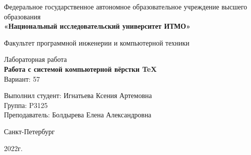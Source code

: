 \thispagestyle{empty}
\begin{center}
     Федеральное государственное автономное образовательное учреждение высшего образования\\
    \textbf{«Национальный исследовательский университет ИТМО»}
    
    \vspace{1em}
    Факультет программной инженерии и компьютерной техники

    \vspace{20em}

    {\large Лабораторная работа }\\
    {\Large \textbf{Работа с системой компьютерной вёрстки \TeX}}\\[1em]
    Вариант: 57
\end{center}

\vspace{20em}

\begin{flushright}
    Выполнил студент:
    Игнатьева Ксения Артемовна\\
    Группа: P3125\\
    Преподаватель:
    Болдырева Елена Александровна\\
\end{flushright}

\vspace{\fill}

\begin{center}
Санкт-Петербург

2022г.
\end{center}